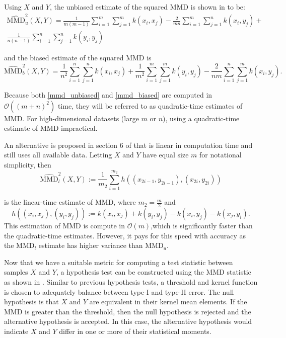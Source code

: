 Using $X$ and $Y$, the unbiased estimate of the squared MMD is shown in \cite{gretton2012kernel} to be:
\begin{equation}
\label{mmd_unbiased}
\begin{split}
\widehat{\text{MMD}}_{u}^{2}(X, Y)=\frac{1}{m(m-1)} \sum_{i=1}^m \sum_{ j=1}^{m} k\left(x_{i}, x_{j}\right)-\frac{2}{m n} \sum_{i=1}^m \sum_{ j=1}^{n} k\left(x_{i}, y_{j}\right)+ \\
\frac{1}{n(n-1)} \sum_{i=1}^n \sum_{j=1}^{n} k\left(y_{i}, y_{j}\right)
\end{split}
\end{equation}

and the biased estimate of the squared MMD is
\begin{equation}
\label{mmd_biased}
\widehat{\text{MMD}}_{b}^{2}(X, Y)= \frac{1}{n^{2}} \sum_{i=1}^{n} \sum_{j=1}^{n} k\left(x_{i}, x_{j}\right)+\frac{1}{m^{2}} \sum_{i=1}^{m} \sum_{j=1}^{m} k\left(y_{i}, y_{j}\right)-\frac{2}{n m} \sum_{i=1}^{n} \sum_{j=1}^{m} k\left(x_{i}, y_{j}\right).
\end{equation}

Because both \ref{mmd_unbiased} and \ref{mmd_biased} are computed in $\mathcal{O}((m + n)^2)$ time, they will be referred to as quadratic-time estimates of MMD. For high-dimensional datasets (large $m$ or $n$), using a quadratic-time estimate of MMD impractical. 

An alternative is proposed in section 6 of \cite{gretton2012kernel} that is linear in computation time and still uses all available data. Letting $X$ and $Y$ have equal size $m$ for notational simplicity, then
\begin{equation}
\label{mmd_linear}
\widehat{\text{MMD}}_{l}^{2}(X, Y) :=\frac{1}{m_{2}} \sum_{i=1}^{m_{2}} h\left(\left(x_{2 i-1}, y_{2 i-1}\right),\left(x_{2 i}, y_{2 i}\right)\right)
\end{equation}

is the linear-time estimate of MMD, where $m_2=\frac{m}{2}$ and
\begin{equation}
h\left((x_i, x_j), (y_i, y_j)\right):=k\left(x_{i}, x_{j}\right)+k\left(y_{i}, y_{j}\right)-k\left(x_{i}, y_{j}\right)-k\left(x_{j}, y_{i}\right).
\end{equation}
This estimation of MMD is compute in $\mathcal{O}(m)$,which is significantly faster than the quadratic-time estimates. However, it pays for this speed with accuracy as the MMD$_l$ estimate has higher variance than MMD$_u$.

Now that we have a suitable metric for computing a test statistic between samples $X$ and $Y$, a hypothesis test can be constructed using the MMD statistic as shown in \cite{gretton2012kernel}. Similar to previous hypothesis tests, a threshold and kernel function is chosen to adequately balance between type-I and type-II error. The null hypothesis is that $X$ and $Y$ are equivalent in their kernel mean elements.  If the MMD is greater than the threshold, then the null hypothesis is rejected and the alternative hypothesis is accepted. In this case, the alternative hypothesis would indicate $X$ and $Y$ differ in one  or more of their statistical moments.

